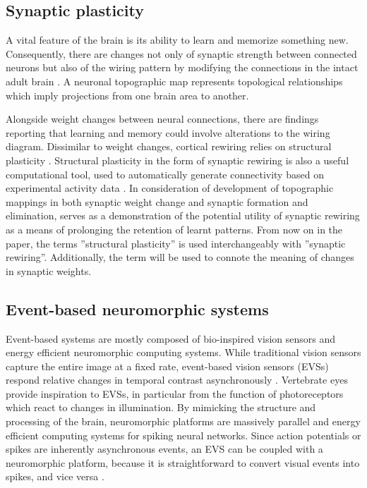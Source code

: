 \documentclass{article}
\begin{document}
\subsection{Synaptic plasticity}

A vital feature of the brain is its ability to learn and memorize something new. 
Consequently, there are changes not only of synaptic strength between connected neurons but also of the wiring pattern by modifying the connections in the intact adult brain \cite{albieri2015rapid}.
A neuronal topographic map represents topological relationships which imply projections from one brain area to another.

Alongside weight changes between neural connections, there are findings reporting that learning and memory  could involve alterations to the wiring diagram.
Dissimilar to weight changes, cortical rewiring relies on structural plasticity \cite{Chklovskii2004b}.
Structural plasticity in the form of synaptic rewiring is also a useful computational tool, used to automatically generate connectivity based on experimental activity data \cite{Diaz-Pier2016a}.
In consideration of development of topographic mappings in both synaptic weight change and synaptic formation and elimination, \cite{bamford2010synaptic} serves as a demonstration of the potential utility of synaptic rewiring as a means of prolonging the retention of learnt patterns.
From now on in the paper, the terms ''structural plasticity'' is used interchangeably with ''synaptic rewiring''.
Additionally, the term will be used to connote the meaning of changes in synaptic weights.

\subsection{Event-based neuromorphic systems}

Event-based systems are mostly composed of bio-inspired vision sensors and energy efficient neuromorphic computing systems. 
While traditional vision sensors capture the entire image at a fixed rate, event-based vision sensors (EVSs) respond relative changes in temporal contrast asynchronously \cite{Indiveri2015}.
Vertebrate eyes provide inspiration to EVSs, in particular from the function of photoreceptors which react to changes in illumination.
By mimicking the structure and processing of the brain, neuromorphic platforms are massively parallel and energy efficient computing systems for spiking neural networks.
Since action potentials or spikes are inherently asynchronous events, an EVS can be coupled with a neuromorphic platform, because it is straightforward to convert visual events into spikes, and vice versa  \cite{Gallego2019}.
\end{document}
